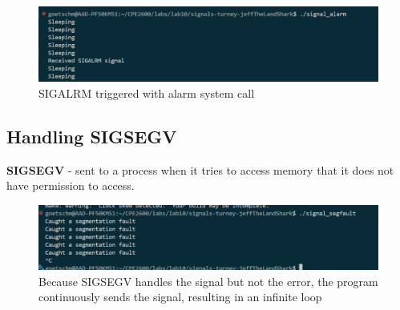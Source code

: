 \documentclass{assignment}
\begin{document}
\begin{figure}
    \centering
    \includegraphics[width=1\linewidth]{images/SIGALRM.png}
    \caption{SIGALRM triggered with alarm system call}
\end{figure}

\subsection{Handling SIGSEGV}

\textbf{SIGSEGV} - sent to a process when it tries to access memory that it does not have permission to access.

\begin{figure}
    \centering
    \includegraphics[width=1\linewidth]{images/SIGSEGV.png}
    \caption{Because SIGSEGV handles the signal but not the error, the program continuously sends the signal, resulting in an infinite loop}
\end{figure}



\end{document}
